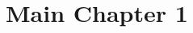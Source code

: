 \documentclass[ngerman,12pt,a4paper,oneside]{scrbook}
\begin{document}
	
\frontmatter
	


\mainmatter
		
	
	\chapter{Main Chapter 1}
	\blindtext[5]
		



\backmatter

	\listoffigures
	\listoftables
	
	\appendix
\end{document}

